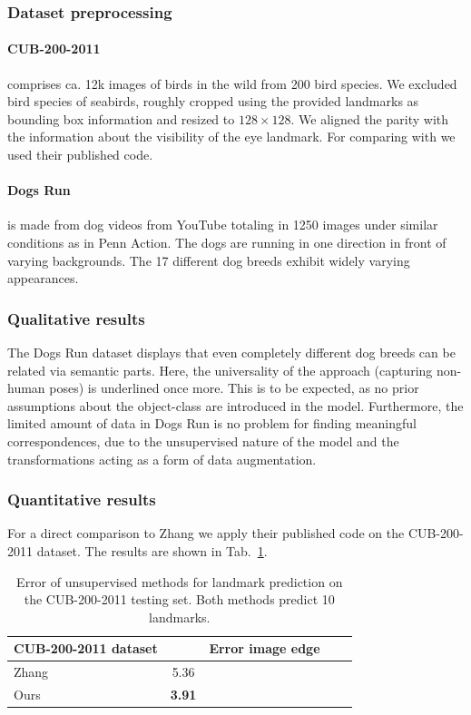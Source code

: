 		\subsubsection{Dataset preprocessing}
			\paragraph{CUB-200-2011} \cite{wah11birds} comprises ca. 12k images of birds in the wild from 200 bird species.
			We excluded bird species of seabirds, roughly cropped using the provided landmarks as bounding box information and resized to $128\times128$.
			We aligned the parity with the information about the visibility of the eye landmark.
			For comparing with \cite{zhang18} we used their published code.

			\paragraph{Dogs Run} is made from dog videos from YouTube totaling in 1250 images under similar conditions as in Penn Action. The dogs are running in one direction in front of varying backgrounds. The 17 different dog breeds exhibit widely varying appearances.

		\subsubsection{Qualitative results}
			The Dogs Run dataset displays that even completely different dog breeds can be related via semantic parts.
			Here, the universality of the approach (capturing non-human poses) is underlined once more.
			This is to be expected, as no prior assumptions about the object-class are introduced in the model.
			Furthermore, the limited amount of data in Dogs Run is no problem for finding meaningful correspondences, due to the unsupervised nature of the model and the transformations acting as a form of data augmentation.

		\subsubsection{Quantitative results}

			For a direct comparison to Zhang \etal \cite{zhang18} we apply their published code on the CUB-200-2011 dataset. The results are shown in Tab.~\ref{tab:birds}.

			\begin{table}[t]
				\caption{Error of unsupervised methods for landmark prediction on the CUB-200-2011 testing set. Both methods predict 10 landmarks.}
				\label{tab:birds}
				\centering
				\begin{tabular}{l|cccc}
					\hline
					CUB-200-2011 dataset&  & Error \wrt image edge\\
					\hline
					Zhang \cite{zhang18} & 5.36 \\
					Ours  & \textbf{3.91}  \\ \hline
				\end{tabular}
			\end{table}

